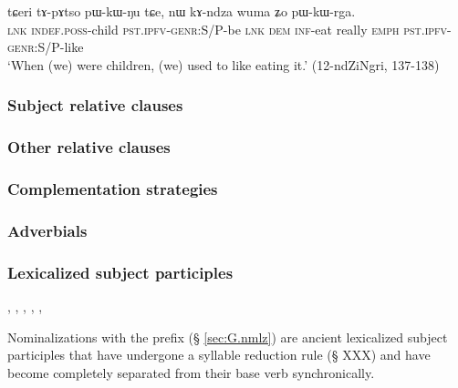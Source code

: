 \begin{exe}
\ex \label{ex:pWkWNu.genr}
 \gll tɕeri tɤ-pɤtso pɯ-kɯ-ŋu tɕe, nɯ kɤ-ndza wuma ʑo pɯ-kɯ-rga. \\
 \textsc{lnk} \textsc{indef}.\textsc{poss}-child \textsc{pst}.\textsc{ipfv}-\textsc{genr}:S/P-be \textsc{lnk} \textsc{dem} \textsc{inf}-eat really \textsc{emph} \textsc{pst}.\textsc{ipfv}-\textsc{genr}:S/P-like \\
 \glt `When (we) were children, (we) used to like eating it.' (12-ndZiNgri, 137-138)
\end{exe}

\subsubsection{Subject relative clauses}  \label{ex:subject.participle.subject.relative}


\subsubsection{Other relative clauses}  \label{ex:subject.participle.other.relative}

\subsubsection{Complementation strategies}  \label{ex:subject.participle.complementation}
\subsubsection{Adverbials} \label{ex:subject.participle.adverbial}


\subsubsection{Lexicalized subject participles} \label{ex:lexicalized.subject.participle}
, , , , , 

Nominalizations with the  prefix (§ \ref{sec:G.nmlz}) are ancient lexicalized subject participles that have undergone a syllable reduction rule (§ XXX) and have become completely separated from their base verb synchronically.

